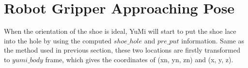 \begin{figure}[H]
\centering
{}
\caption{}
\end{figure}


\section{Robot Gripper Approaching Pose}
When the orientation of the shoe is ideal, YuMi will start to put the shoe lace into the hole by using the computed $shoe\_hole$ and $pre\_put$ information. Same as the method used in previous section, these two locations are firstly transformed to $yumi\_body$ frame, which gives the coordinates of (xn, yn, zn) and (x, y, z). 

